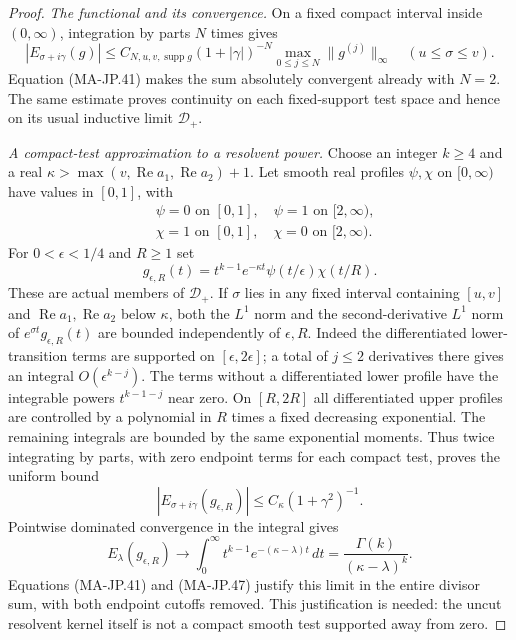 \begin{proof}
\emph{The functional and its convergence.}
On a fixed compact interval inside $(0,\infty)$,
integration by parts $N$ times gives
\[
 |E_{\sigma+i\gamma}(g)|
  \le C_{N,u,v,\operatorname{supp}g}
        (1+|\gamma|)^{-N}
                \max_{0\le j\le N}\|g^{(j)}\|_\infty
                  \quad(u\le\sigma\le v).
 \tag{MA-JP.45}
\]
Equation (MA-JP.41) makes the sum absolutely convergent
already with $N=2$.  The same estimate proves continuity
on each fixed-support test space and hence on its
usual inductive limit $\mathcal D_+$.

\emph{A compact-test approximation to a resolvent power.}
Choose an integer $k\ge4$ and a real
$\kappa>\max(v,\operatorname{Re}a_1,
\operatorname{Re}a_2)+1$.
Let smooth real profiles $\psi,\chi$ on $[0,\infty)$
have values in $[0,1]$, with
\[
 \begin{aligned}
 &\psi=0\text{ on }[0,1],\quad \psi=1\text{ on }[2,\infty),\\
 &\chi=1\text{ on }[0,1],\quad \chi=0\text{ on }[2,\infty).
 \end{aligned}
\]
For $0<\epsilon<1/4$ and $R\ge1$ set
\[
 g_{\epsilon,R}(t)=t^{k-1}e^{-\kappa t}
                    \psi(t/\epsilon)\chi(t/R).
 \tag{MA-JP.46}
\]
These are actual members of $\mathcal D_+$.
If $\sigma$ lies in any fixed interval containing
$[u,v]$ and $\operatorname{Re}a_1,
\operatorname{Re}a_2$ below $\kappa$, both the
$L^1$ norm and the second-derivative $L^1$ norm of
$e^{\sigma t}g_{\epsilon,R}(t)$ are bounded independently
of $\epsilon,R$.
Indeed the differentiated lower-transition terms are
supported on $[\epsilon,2\epsilon]$; a total of $j\le2$
derivatives there gives an integral $O(\epsilon^{k-j})$.
The terms without a differentiated lower profile have
the integrable powers $t^{k-1-j}$ near zero.
On $[R,2R]$ all differentiated upper profiles are
controlled by a polynomial in $R$ times a fixed
decreasing exponential.  The remaining integrals
are bounded by the same exponential moments.
Thus twice integrating by parts, with zero endpoint
terms for each compact test, proves the uniform bound
\[
 |E_{\sigma+i\gamma}(g_{\epsilon,R})|
                  \le C_\kappa(1+\gamma^2)^{-1}.
 \tag{MA-JP.47}
\]
Pointwise dominated convergence in the integral gives
\[
 E_\lambda(g_{\epsilon,R})\longrightarrow
       \int_0^\infty t^{k-1}e^{-(\kappa-\lambda)t}\,dt
       =\frac{\Gamma(k)}{(\kappa-\lambda)^k}.
 \tag{MA-JP.48}
\]
Equations (MA-JP.41) and (MA-JP.47) justify this
limit in the entire divisor sum, with both endpoint
cutoffs removed.  This justification is needed:
the uncut resolvent kernel itself is not a compact
smooth test supported away from zero.


\end{proof}

